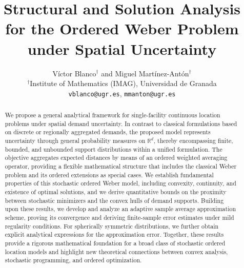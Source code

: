 \documentclass[letter,11pt, reqno]{amsart}
\newcommand{\R}{\mathbb{R}}
\renewcommand{\;}{\quad}
\theoremstyle{thmstyleone}%
\theoremstyle{thmstyletwo}%
\theoremstyle{thmstylethree}%
\let\origmaketitle\maketitle
\def\maketitle{
	\begingroup
	\def\uppercasenonmath##1{} %
	\let\MakeUppercase\relax %
	\origmaketitle
	\endgroup
}
\begin{document}
\title[]{\Large Structural and Solution Analysis for the Ordered Weber Problem under Spatial Uncertainty}

\author[V. Blanco, D. Laborda \MakeLowercase{and} M. Mart\'inez-Ant\'on]{
{\large V\'ictor Blanco$^{\dagger}$ and  Miguel Mart\'inez-Ant\'on$^{\dagger}$}\medskip\\
$^\dagger$Institute of Mathematics (IMAG), Universidad de Granada\\
\texttt{vblanco@ugr.es}, \texttt{mmanton@ugr.es}
}

\maketitle

\begin{abstract}
We propose a general analytical framework for single-facility continuous location problems under spatial demand uncertainty. In contrast to classical formulations based on discrete or regionally aggregated demands, the proposed model represents uncertainty through general probability measures on $\R^d$, thereby encompassing finite, bounded, and unbounded support distributions within a unified formulation. The objective aggregates expected distances by means of an ordered weighted averaging operator, providing a flexible mathematical structure that includes the classical Weber problem and its ordered extensions as special cases. We establish fundamental properties of this stochastic ordered Weber model, including convexity, continuity, and existence of optimal solutions, and we derive quantitative bounds on the proximity between stochastic minimizers and the convex hulls of demand supports. Building upon these results, we develop and analyze an adaptive sample average approximation scheme, proving its convergence and deriving finite-sample error estimates under mild regularity conditions. For spherically symmetric distributions, we further obtain explicit analytical expressions for the approximation error. Together, these results provide a rigorous mathematical foundation for a broad class of stochastic ordered location models and highlight new theoretical connections between convex analysis, stochastic programming, and ordered optimization.
\end{abstract}


\end{document}
